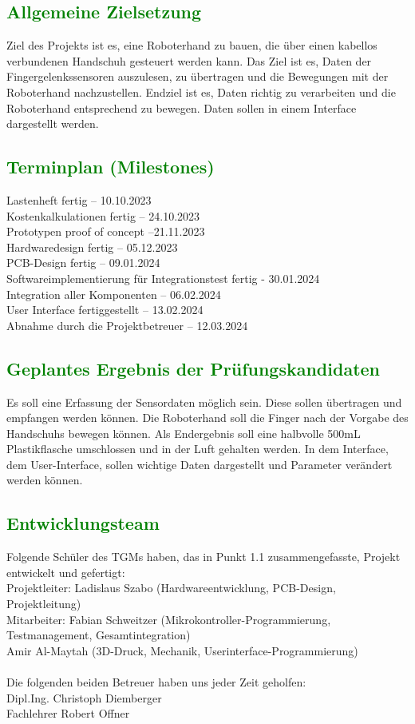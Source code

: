 \documentclass[11pt]{article}
\begin{document}
\subsection{\textcolor{green}{Allgemeine Zielsetzung}}
Ziel des Projekts ist es, eine Roboterhand zu bauen, die über einen kabellos verbundenen
Handschuh gesteuert werden kann. Das Ziel ist es, Daten der Fingergelenkssensoren auszulesen,
zu übertragen und die Bewegungen mit der Roboterhand nachzustellen. Endziel ist es, Daten
richtig zu verarbeiten und die Roboterhand entsprechend zu bewegen. Daten sollen in einem
Interface dargestellt werden.

\subsection{\textcolor{green}{Terminplan (Milestones)}}
Lastenheft fertig – 10.10.2023 \\
Kostenkalkulationen fertig – 24.10.2023 \\
Prototypen proof of concept –21.11.2023 \\
Hardwaredesign fertig – 05.12.2023 \\
PCB-Design fertig – 09.01.2024 \\
Softwareimplementierung für Integrationstest fertig - 30.01.2024 \\
Integration aller Komponenten – 06.02.2024 \\
User Interface fertiggestellt – 13.02.2024 \\
Abnahme durch die Projektbetreuer – 12.03.2024

\subsection{\textcolor{green}{Geplantes Ergebnis der Prüfungskandidaten}}
Es soll eine Erfassung der Sensordaten möglich sein. Diese sollen übertragen und empfangen
werden können. Die Roboterhand soll die Finger nach der Vorgabe des Handschuhs bewegen
können. Als Endergebnis soll eine halbvolle 500mL Plastikflasche umschlossen und in der Luft
gehalten werden. In dem Interface, dem User-Interface, sollen wichtige Daten dargestellt und
Parameter verändert werden können.

\subsection{\textcolor{green}{Entwicklungsteam}}
Folgende Schüler des TGMs haben, das in Punkt 1.1 zusammengefasste, Projekt entwickelt und gefertigt: \hfill \break
\\
Projektleiter:    Ladislaus Szabo (Hardwareentwicklung, PCB-Design, Projektleitung)\\
Mitarbeiter: Fabian Schweitzer (Mikrokontroller-Programmierung, Testmanagement, Gesamtintegration)\\
Amir Al-Maytah (3D-Druck, Mechanik, Userinterface-Programmierung) 
\\
\\
Die folgenden beiden Betreuer haben uns jeder Zeit geholfen:
\\
Dipl.Ing. Christoph Diemberger \\
Fachlehrer Robert Offner
\end{document}
